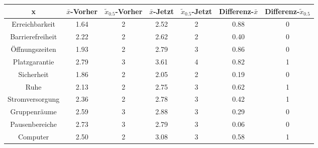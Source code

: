 \documentclass[11pt, a4paper]{article}
\begin{document}
\begin{table}[]
		\vspace*{0cm}
	\begin{tabular}{c|cccccc}
		x                & $\bar{x}$-Vorher & $\tilde{x}_{0.5}$-Vorher & $\bar{x}$-Jetzt &$\tilde{x}_{0.5}$-Jetzt & Differenz-$\bar{x}$ & Differenz-$\tilde{x}_{0.5}$\\ \hline
		Erreichbarkeit   & 1.64              & 2             & 2.52             & 2            & 0.88                 & 0                \\
		Barrierefreiheit & 2.22              & 2             & 2.62             & 2            & 0.40                 & 0                \\
		Öffnungszeiten   & 1.93              & 2             & 2.79             & 3            & 0.86                 & 0                \\
		Platzgarantie    & 2.79              & 3             & 3.61             & 4            & 0.82                 & 1                \\
		Sicherheit       & 1.86              & 2             & 2.05             & 2            & 0.19                 & 0                \\
		Ruhe             & 2.13              & 2             & 2.75             & 3            & 0.62                 & 1                \\
		Stromversorgung  & 2.36              & 2             & 2.78             & 3            & 0.42                 & 1                \\
		Gruppenräume     & 2.59              & 3             & 2.88             & 3            & 0.29                 & 0                \\
		Pausenbereiche   & 2.73              & 3             & 2.79             & 3            & 0.06                 & 0                \\
		Computer         & 2.50              & 2             & 3.08             & 3            & 0.58                 & 1               
	\end{tabular}
\end{table}

\newpage
\end{document}
